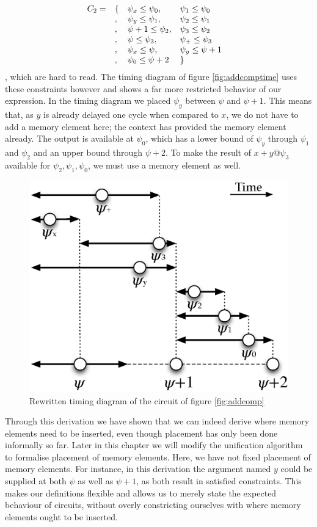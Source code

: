 \[
\begin{array}{l l l l l}
C_2 = & \{ & \psi_x \le \psi_0, & \psi_1 \le \psi_0 \\
      &,   & \psi_y \le \psi_1, & \psi_2 \le \psi_1 \\
      &,   & \psi + 1 \le \psi_2, & \psi_3 \le \psi_2\\
      &,   & \psi \le \psi_3, & \psi_+ \le \psi_3 & \\ 
      &,   & \psi_x \le \psi, & \psi_y \le \psi + 1 \\
      &,   & \psi_0 \le \psi+2 & \}
\end{array}
\], which are hard to read.
The timing diagram of figure \ref{fig:addcomptime} uses these constraints however and shows a far more restricted behavior of our expression.
In the timing diagram we placed $\psi_y$ between $\psi$ and $\psi + 1$.
This means that, as $y$ is already delayed one cycle when compared to $x$, we do not have to add a memory element here; the context has provided the memory element already.
The output is available at $\psi_0$, which has a lower bound of $\psi_y$ through $\psi_1$ and $\psi_2$ and an upper bound through $\psi+2$.
To make the result of $x + y @ \psi_3$ available for $\psi_2, \psi_1, \psi_0$, we must use a memory element as well.

\begin{figure}[h]
\centering
\includegraphics[width=0.6\linewidth]{images/addcomptime2}
\caption{Rewritten timing diagram of the circuit of figure \ref{fig:addcomp}}
\label{fig:addcomptime2}
\end{figure}

Through this derivation we have shown that we can indeed derive where memory elements need to be inserted, even though placement has only been done informally so far.
Later in this chapter we will modify the unification algorithm to formalise placement of memory elements.
Here, we have not fixed placement of memory elements.
For instance, in this derivation the argument named $y$ could be supplied at both $\psi$ as well as $\psi+1$, as both result in satisfied constraints.
This makes our definitions flexible and allows us to merely state the expected behaviour of circuits, without overly constricting ourselves with where memory elements ought to be inserted.

